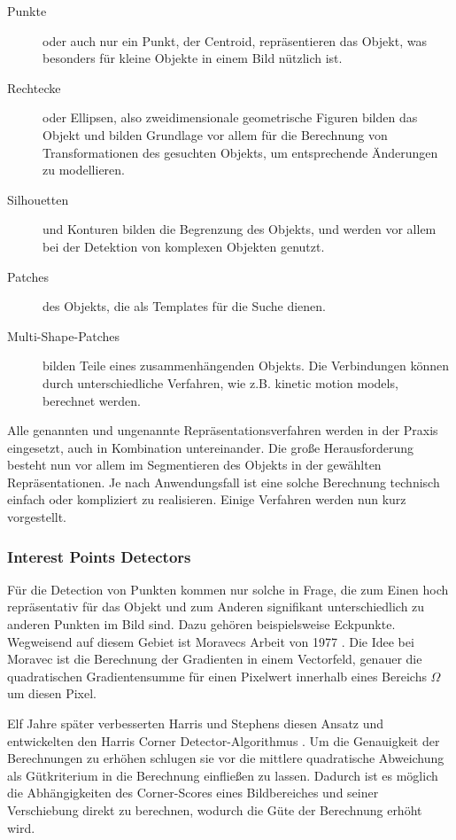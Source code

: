 \begin{description}
\item [{Punkte}] oder auch nur ein Punkt, der Centroid, repräsentieren das Objekt, was besonders für kleine Objekte in einem Bild nützlich ist.
\item [{Rechtecke}] oder Ellipsen, also zweidimensionale geometrische Figuren bilden das Objekt und bilden Grundlage vor allem für die Berechnung von Transformationen des gesuchten Objekts, um entsprechende Änderungen zu modellieren.
\item [{Silhouetten}] und Konturen bilden die Begrenzung des Objekts, und werden vor allem bei der Detektion von komplexen Objekten genutzt.
\item [{Patches}] des Objekts, die als Templates für die Suche dienen.
\item [{Multi-Shape-Patches}] bilden Teile eines zusammenhängenden Objekts. Die Verbindungen können durch unterschiedliche Verfahren, wie z.B. kinetic motion models, berechnet werden.
\end{description}

Alle genannten und ungenannte Repräsentationsverfahren werden in der Praxis eingesetzt, auch in Kombination untereinander. Die große Herausforderung besteht nun vor allem im Segmentieren des Objekts in der gewählten Repräsentationen. Je nach Anwendungsfall ist eine solche Berechnung technisch einfach oder kompliziert zu realisieren. Einige Verfahren werden nun kurz vorgestellt.

\subsubsection{Interest Points Detectors}
Für die Detection von Punkten kommen nur solche in Frage, die zum Einen hoch repräsentativ für das Objekt und zum Anderen signifikant unterschiedlich zu anderen Punkten im Bild sind. Dazu gehören beispielsweise Eckpunkte. Wegweisend auf diesem Gebiet ist Moravecs Arbeit von 1977 \cite{OAN}. Die Idee bei Moravec ist die Berechnung der Gradienten in einem Vectorfeld, genauer die quadratischen Gradientensumme für einen Pixelwert innerhalb eines Bereichs $\Omega$ um diesen Pixel.

Elf Jahre später verbesserten Harris und Stephens diesen Ansatz und entwickelten den Harris Corner Detector-Algorithmus \cite{HCD}. Um die Genauigkeit der Berechnungen zu erhöhen schlugen sie vor die mittlere quadratische Abweichung als Gütkriterium in die Berechnung einfließen zu lassen. Dadurch ist es möglich die Abhängigkeiten des Corner-Scores eines Bildbereiches und seiner Verschiebung direkt zu berechnen, wodurch die Güte der Berechnung erhöht wird.

